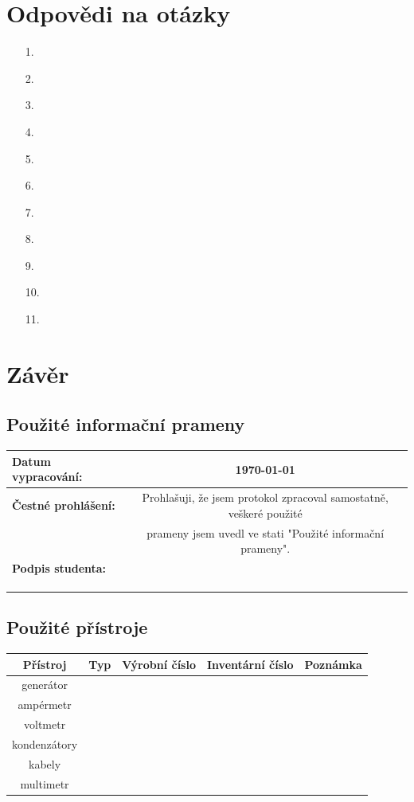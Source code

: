 \documentclass[a4paper,12pt]{report}
\begin{document}
\chapter*{Odpovědi na otázky}
\begin{itemize}
 \item [1.]{}
 \item [2.]{}
 \item [3.]{}
 \item [4.]{}
 \item [5.]{}
 \item [6.]{}
 \item [7.]{}
 \item [8.]{}
 \item [9.]{}
 \item [10.]{}
 \item [11.]{}
\end{itemize}
\newpage
\chapter*{Závěr}
\section*{Použité informační prameny}
\begin{tabular}{|l|c|}
\hline
\textbf{Datum vypracování:} & \today \\\hline
\textbf{Čestné prohlášení:} & Prohlašuji, že jsem protokol zpracoval samostatně, veškeré použité \\
                            & prameny jsem uvedl ve stati "Použité informační prameny". \\\hline
\textbf{Podpis studenta:}   & \\
							& \\
							& \\
							& \\\hline
\end{tabular}
\section*{Použité přístroje}
	\begin{tabular}{|c|c|c|c|c|}
\hline
Přístroj     & Typ & Výrobní číslo & Inventární číslo & Poznámka \\\hline
generátor    &     &               &                  &          \\\hline
ampérmetr    &     &               &                  &          \\\hline
voltmetr     &     &               &                  &          \\\hline
kondenzátory &     &               &                  &          \\\hline
kabely       &     &               &                  &          \\\hline
multimetr    &     &               &                  &          \\\hline
	\end{tabular}
\end{document}
